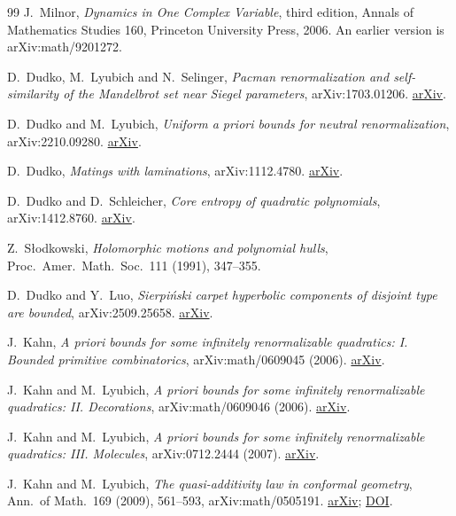 \documentclass[11pt,a4paper,oneside,openany]{book}
\theoremstyle{definition}
\theoremstyle{remark}
\begin{document}
\begin{thebibliography}{99}
J.~Milnor, \emph{Dynamics in One Complex Variable}, third edition,
Annals of Mathematics Studies 160, Princeton University Press, 2006.
An earlier version is arXiv:math/9201272.

D.~Dudko, M.~Lyubich and N.~Selinger, \emph{Pacman renormalization and self-similarity of the
Mandelbrot set near Siegel parameters}, arXiv:1703.01206.
\href{https://arxiv.org/abs/1703.01206}{arXiv}.

D.~Dudko and M.~Lyubich, \emph{Uniform a priori bounds for neutral renormalization}, arXiv:2210.09280.
\href{https://arxiv.org/abs/2210.09280}{arXiv}.

D.~Dudko, \emph{Matings with laminations}, arXiv:1112.4780.
\href{https://arxiv.org/abs/1112.4780}{arXiv}.

D.~Dudko and D.~Schleicher, \emph{Core entropy of quadratic polynomials}, arXiv:1412.8760.
\href{https://arxiv.org/abs/1412.8760}{arXiv}.

Z.~S\l{}odkowski, \emph{Holomorphic motions and polynomial hulls}, Proc.\ Amer.\ Math.\ Soc.\ 111 (1991), 347--355.

D.~Dudko and Y.~Luo, \emph{Sierpi\'nski carpet hyperbolic components of disjoint type are bounded}, arXiv:2509.25658.
\href{https://arxiv.org/abs/2509.25658}{arXiv}.

J.~Kahn,
\emph{A priori bounds for some infinitely renormalizable quadratics: I. Bounded primitive combinatorics}, arXiv:math/0609045 (2006).
\href{https://arxiv.org/abs/math/0609045}{arXiv}.

J.~Kahn and M.~Lyubich,
\emph{A priori bounds for some infinitely renormalizable quadratics: II. Decorations}, arXiv:math/0609046 (2006).
\href{https://arxiv.org/abs/math/0609046}{arXiv}.

J.~Kahn and M.~Lyubich,
\emph{A priori bounds for some infinitely renormalizable quadratics: III. Molecules}, arXiv:0712.2444 (2007).
\href{https://arxiv.org/abs/0712.2444}{arXiv}.

J.~Kahn and M.~Lyubich,
\emph{The quasi-additivity law in conformal geometry}, Ann.\ of Math.\ 169 (2009), 561--593, arXiv:math/0505191.
\href{https://arxiv.org/abs/math/0505191}{arXiv};
\href{https://doi.org/10.4007/annals.2009.169.561}{DOI}.


\end{thebibliography}
\end{document}

